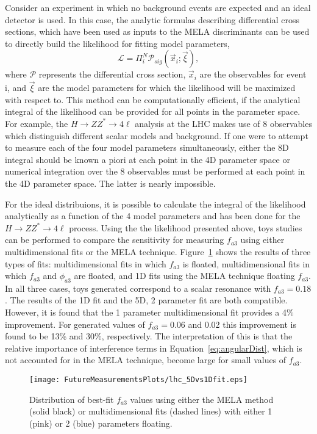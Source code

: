 Consider an experiment in which no background events are expected
and an ideal detector is used.  In this case, the analytic formulas
describing differential cross
sections, which have been used as inputs to the MELA discriminants
can be used to directly build the likelihood for fitting 
model parameters,
\begin{equation}
\mathscr{L}=\Pi^N_i \mathscr{P}_{sig}(\vec{x}_i ; \vec{\xi}),
\end{equation}
where $\mathscr{P}$ represents the differential cross section, 
$\vec{x}_i$ are the observables for event i, and $\vec{\xi}$ 
are the model parameters for which the likelihood will be 
maximized with respect to.
This method can be computationally efficient, if the analytical
integral of the likelihood can be provided for all points in the
parameter space.  For example, the 
$H\to ZZ^*\to4\ell$ analysis at the LHC makes use of 8 observables
which distinguish different scalar models and background.  If one
were to attempt to measure each of the four model parameters
simultaneously,
either the 8D integral should be known a piori at each
point in the 4D parameter space or numerical integration 
over the 8 observables must be performed at each point in the 
4D parameter space.  The latter is nearly impossible.  

For the ideal distribuions, it is possible to calculate the
integral of the likelihood analytically as a function of the
4 model parameters and has been done for the $H\to ZZ^*\to 4\ell$
process.  Using the the likelihood presented above, 
toys studies can be performed to compare the sensitivity for 
measuring $f_{a3}$ using either multidimensional fits or the
MELA technique.  Figure~\ref{fig:fa3MultiDimComp} shows the
results of three 
types of fits: multidimensional fits in which $f_{a3}$ is
floated, multidimensional fits in which $f_{a3}$ and $\phi_{a3}$
are floated, and 1D fits using the MELA technique floating $f_{a3}$.
In all three cases, toys generated correspond to
a scalar resonance with $f_{a3}=0.18$.  The results of the
1D fit and the 5D, 2 parameter fit are both compatible.  However,
it is found that the 1 parameter multidimensional fit provides a
4\% improvement.  For generated
values of $f_{a3}=0.06$ and 0.02 this improvement is found to be
13\% and 30\%, respectively.  The interpretation of this is that
the relative importance of interference terms in Equation~\ref{eq:angularDist},
which is not accounted for in the MELA technique, become large for
small values of $f_{a3}$.

\begin{figure}
\begin{center}
\texttt{[image: FutureMeasurementsPlots/lhc\_5Dvs1Dfit.eps]}
\caption{Distribution of best-fit $f_{a3}$ values using either 
the MELA method (solid black) or multidimensional fits (dashed
lines) with either 1 (pink) or 2 (blue) parameters floating.}
\label{fig:fa3MultiDimComp}
\end{center}
\end{figure}

